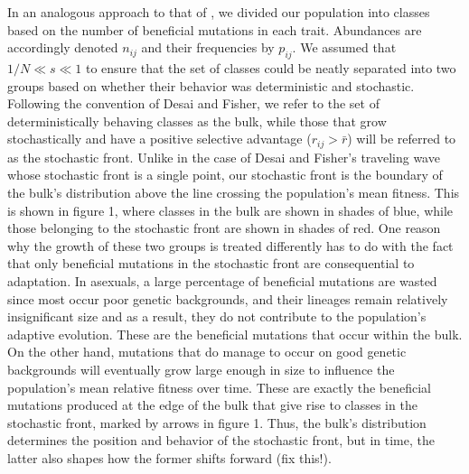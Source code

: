 \documentclass[11pt,twocolumn]{article}
\begin{document}
In an analogous approach to that of \citet{desai2007beneficial}, we divided our population into classes based on the number of beneficial mutations in each trait. Abundances are accordingly denoted $n_{ij}$ and their frequencies by $p_{ij}$. We assumed that $1/N \ll s \ll 1$ to ensure that the set of classes could be neatly separated into two groups based on whether their behavior was deterministic and stochastic. Following the convention of Desai and Fisher, we refer to the set of deterministically behaving classes as the bulk, while those that grow stochastically and have a positive selective advantage ($r_{ij}>\bar{r}$) will be referred to as the stochastic front. Unlike in the case of Desai and Fisher's  traveling wave whose stochastic front is a single point, our stochastic front is the boundary of the bulk's distribution above the line crossing the population's mean fitness. This is shown in figure 1, where classes in the bulk are shown in shades of blue, while those belonging to the stochastic front are shown in shades of red. One reason why the growth of these two groups is treated differently has to do with the fact that only beneficial mutations in the stochastic front are consequential to adaptation. In asexuals, a large percentage of beneficial mutations are wasted since most occur poor genetic backgrounds, and their lineages remain relatively insignificant size and as a result, they do not contribute to the population's adaptive evolution. These are the beneficial mutations that occur within the bulk. On the other hand, mutations that do manage to occur on good genetic backgrounds will eventually grow large enough in size to influence the population's mean relative fitness over time. These are exactly the beneficial mutations produced at the edge of the bulk that give rise to classes in the stochastic front, marked by arrows in figure 1. Thus, the bulk's distribution determines the position and behavior of the stochastic front, but in time, the latter also shapes how the former shifts forward (fix this!).\par
% 
% 
% 
%
\end{document}
